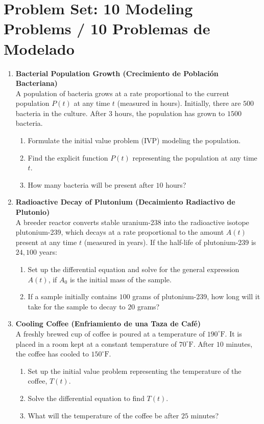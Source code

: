 \documentclass[11pt,letterpaper]{article}
\begin{document}
\newpage
\section{Problem Set: 10 Modeling Problems / 10 Problemas de Modelado}

\begin{enumerate}[label=\textbf{Problem \arabic*:}, leftmargin=*]

    \item \textbf{Bacterial Population Growth (Crecimiento de Población Bacteriana)} \\
    A population of bacteria grows at a rate proportional to the current population $P(t)$ at any time $t$ (measured in hours). Initially, there are $500$ bacteria in the culture. After $3$ hours, the population has grown to $1500$ bacteria.
    \begin{enumerate}[label=(\alph*)]
        \item Formulate the initial value problem (IVP) modeling the population.
        \item Find the explicit function $P(t)$ representing the population at any time $t$.
        \item How many bacteria will be present after $10$ hours?
    \end{enumerate}

    \item \textbf{Radioactive Decay of Plutonium (Decaimiento Radiactivo de Plutonio)} \\
    A breeder reactor converts stable uranium-238 into the radioactive isotope plutonium-239, which decays at a rate proportional to the amount $A(t)$ present at any time $t$ (measured in years). If the half-life of plutonium-239 is $24,100$ years:
    \begin{enumerate}[label=(\alph*)]
        \item Set up the differential equation and solve for the general expression $A(t)$, if $A_0$ is the initial mass of the sample.
        \item If a sample initially contains $100$ grams of plutonium-239, how long will it take for the sample to decay to $20$ grams?
    \end{enumerate}

    \item \textbf{Cooling Coffee (Enfriamiento de una Taza de Café)} \\
    A freshly brewed cup of coffee is poured at a temperature of $190^\circ\text{F}$. It is placed in a room kept at a constant temperature of $70^\circ\text{F}$. After $10$ minutes, the coffee has cooled to $150^\circ\text{F}$.
    \begin{enumerate}[label=(\alph*)]
        \item Set up the initial value problem representing the temperature of the coffee, $T(t)$.
        \item Solve the differential equation to find $T(t)$.
        \item What will the temperature of the coffee be after $25$ minutes?
    \end{enumerate}


\end{enumerate}
\end{document}
